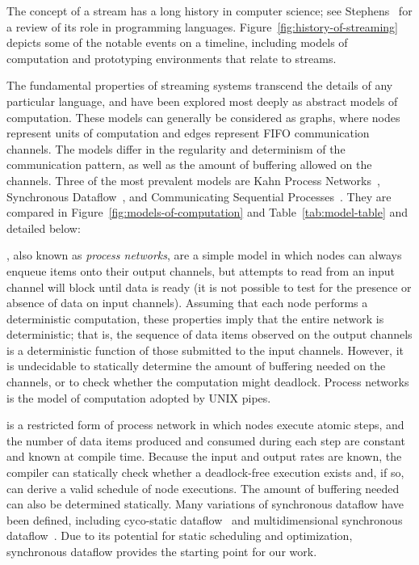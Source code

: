 The concept of a stream has a long history in computer science; see
Stephens~\cite{stephens_survey_1997} for a review of its role in
programming languages.  Figure~\ref{fig:history-of-streaming} depicts
some of the notable events on a timeline, including models of
computation and prototyping environments that relate to streams.

The fundamental properties of streaming systems transcend the details
of any particular language, and have been explored most deeply as
abstract models of computation.  These models can generally be
considered as graphs, where nodes represent units of computation and
edges represent FIFO communication channels.  The models differ in the
regularity and determinism of the communication pattern, as well as
the amount of buffering allowed on the channels.  Three of the most
prevalent models are Kahn Process Networks~\cite{kahn_semantics_1974},
Synchronous Dataflow~\cite{lee_static_1987}, and Communicating
Sequential Processes~\cite{hoare_communicating_1978}.  They are
compared in Figure~\ref{fig:models-of-computation} and
Table~\ref{tab:model-table} and detailed below:

\mybegin

, also known as {\it process
  networks}, are a simple model in which nodes can always enqueue
  items onto their output channels, but attempts to read from an input
  channel will block until data is ready (it is not possible to test
  for the presence or absence of data on input channels).  Assuming
  that each node performs a deterministic computation, these
  properties imply that the entire network is deterministic; that is,
  the sequence of data items observed on the output channels is a
  deterministic function of those submitted to the input channels.
  However, it is undecidable to statically determine the amount of
  buffering needed on the channels, or to check whether the
  computation might deadlock.  Process networks is the model of
  computation adopted by UNIX pipes.

 is a restricted form of process
  network in which nodes execute atomic steps, and the number of data
  items produced and consumed during each step are constant and known
  at compile time.  Because the input and output rates are known, the
  compiler can statically check whether a deadlock-free execution
  exists and, if so, can derive a valid schedule of node executions.
  The amount of buffering needed can also be determined statically.
  Many variations of synchronous dataflow have been defined, including
  cyco-static
  dataflow~\cite{bilsen_cyclo-static_1995,parks_comparison_1995} and
  multidimensional synchronous
  dataflow~\cite{murthy_multidimensional_2002}.  Due to its potential
  for static scheduling and optimization, synchronous dataflow
  provides the starting point for our work.

